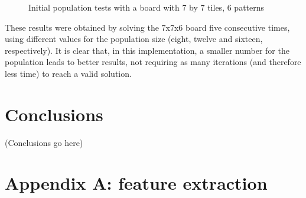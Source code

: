 \documentclass{llncs}
\begin{document}
\begin{figure}[H]
  \centering
  \caption{Initial population tests with a board with 7 by 7 tiles, 6 patterns}
  \label{fig:population_stats}
\end{figure}

These results were obtained by solving the 7x7x6 board five consecutive times, using different values for the population size (eight, twelve and sixteen, respectively). It is clear that, in this implementation, a smaller number for the population leads to better results, not requiring as many iterations (and therefore less time) to reach a valid solution.

\section{Conclusions}\label{sec:conclusions}

(Conclusions go here)
%
%



\newpage

\section*{Appendix A: feature extraction}\label{sec:feature_extraction}
\end{document}
